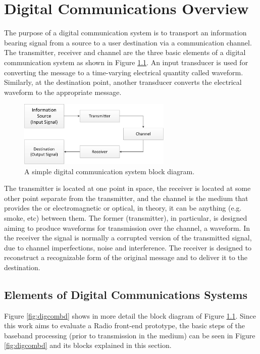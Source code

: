 \chapter{Digital Communications Overview}
\label{cap:digicomm}

The purpose of a digital communication system is to transport an information
bearing signal from a source to a user destination via a communication channel.
The transmitter, receiver and channel are the three basic elements of a digital
communication system as shown in Figure \ref{fig:digicomsimple}. An input
transducer is used for converting the message to a time-varying electrical
quantity called waveform. Similarly, at the destination point, another
transducer converts the electrical waveform to the appropriate message.


\begin{figure}[htbp]
    \centering
    \includegraphics[width=0.65\textwidth]{./figures/digicom_simple}
    \caption{ A simple digital communication system block diagram.
    \label{fig:digicomsimple}}
\end{figure}

The transmitter is located at one point in space, the receiver is located at
some other point separate from the transmitter, and the channel is the medium
that provides the or electromagnetic or optical, in theory, it can be anything
(e.g. smoke, etc) between them. The former (transmitter), in particular, is
designed aiming to produce waveforms for transmission over the channel, a
waveform. In the receiver the signal is normally a corrupted version of the
transmitted signal, due to channel imperfections, noise and interference. The
receiver is designed to reconstruct a recognizable form of the original message
and to deliver it to the destination.

\section{Elements of Digital Communications Systems}

Figure \ref{fig:digcombd} shows in more detail the block diagram of Figure
\ref{fig:digicomsimple}. Since this work aims to evaluate a Radio front-end
prototype, the basic steps of the baseband processing (prior to transmission in
the medium) can be seen in Figure \ref{fig:digcombd} and its blocks explained in
this section.

